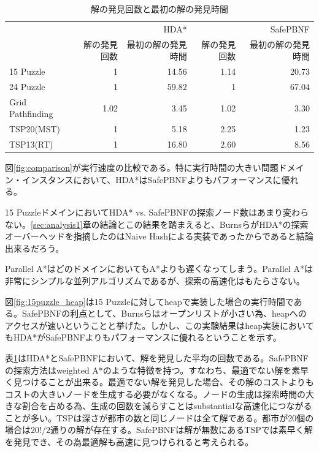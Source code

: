 \documentclass{jsarticle}
\renewcommand{\textbf}{} %
\begin{document}
\begin{table}
	\centering
	\begin{tabular}{lrrrr} \hline
		 & &             HDA* & & SafePBNF \\ 
		 &  解の発見回数 & 最初の解の発見時間 & 解の発見回数 & 最初の解の発見時間 \\ \hline
		15 Puzzle & 1 & 14.56 & 1.14 & 20.73 \\ 
		24 Puzzle & 1 & 59.82 & 1 & 67.04 \\ 
		Grid Pathfinding & 1.02 & 3.45 & 1.02 & 3.30 \\ 
		TSP20(MST) & 1 & 5.18 & \textbf{2.25} & \textbf{1.23} \\ 
		TSP13(RT) & 1 & 16.80 & \textbf{2.60} & \textbf{8.56} \\ \hline
	\end{tabular}
	\caption{解の発見回数と最初の解の発見時間}
	\label{hdastar_incumbent}
\end{table}

図\ref{fig:comparison}が実行速度の比較である。特に実行時間の大きい問題ドメイン・インスタンスにおいて、HDA*はSafePBNFよりもパフォーマンスに優れる。

15 PuzzleドメインにおいてHDA* vs. SafePBNFの探索ノード数はあまり変わらない。\ref{sec:analysis1}章の結論とこの結果を踏まえると、BurnsらがHDA*の探索オーバーヘッドを指摘したのはNaive Hashによる実装であったからであると結論出来るだろう。

Parallel A*はどのドメインにおいてもA*よりも遅くなってしまう。Parallel A*は非常にシンプルな並列アルゴリズムであるが、探索の高速化はもたらさない。

図\ref{fig:15puzzle_heap}は15 Puzzleに対してheapで実装した場合の実行時間である。SafePBNFの利点として、Burnsらはオープンリストが小さい為、heapへのアクセスが速いということと挙げた\cite{Burns2010}。しかし、この実験結果はheap実装においてもHDA*がSafePBNFよりもパフォーマンスに優れるということを示す。

表\ref{hdastar_incumbent}はHDA*とSafePBNFにおいて、解を発見した平均の回数である。SafePBNFの探索方法はweighted A*のような特徴を持つ\cite{Burns2010}。すなわち、最適でない解を素早く見つけることが出来る。最適でない解を発見した場合、その解のコストよりもコストの大きいノードを生成する必要がなくなる。ノードの生成は探索時間の大きな割合を占める為、生成の回数を減らすことはsubstantialな高速化につながることが多い。TSPは深さが都市の数と同じノードは全て解である。都市が20個の場合は$20!/2$通りの解が存在する。SafePBNFは解が無数にあるTSPでは素早く解を発見でき、その為最適解も高速に見つけられると考えられる。
\end{document}

